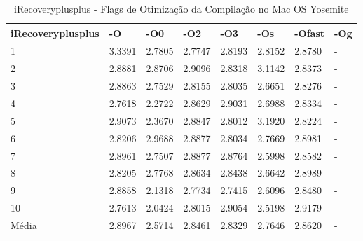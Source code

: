 \begin{table}[!ht]
\centering
\caption{iRecoveryplusplus - Flags de Otimização da Compilação no Mac OS Yosemite}
\label{tab:otimizacao_compilacao:mac:irecoveryplusplus}
\begin{tabular}{llllllll}
\textbf{iRecoveryplusplus} & \textbf{-O}  & \textbf{-O0}   & \textbf{-O2} & \textbf{-O3} & \textbf{-Os} & \textbf{-Ofast} & \textbf{-Og} \\ \toprule
1                          & 3.3391       &   2.7805       &  2.7747      &  2.8193      &  2.8152      &   2.8780        &  -           \\ 
2                          & 2.8881       &   2.8706       &  2.9096      &  2.8318      &  3.1142      &   2.8373        &  -           \\ 
3                          & 2.8863       &   2.7529       &  2.8155      &  2.8035      &  2.6651      &   2.8276        &  -           \\ 
4                          & 2.7618       &   2.2722       &  2.8629      &  2.9031      &  2.6988      &   2.8334        &  -           \\ 
5                          & 2.9073       &   2.3670      &  2.8847      &  2.8012      &  3.1920      &   2.8224        &  -           \\ 
6                          & 2.8206       &   2.9688      &  2.8877      &  2.8034      &  2.7669      &   2.8981        &  -           \\ 
7                          & 2.8961       &   2.7507      &  2.8877      &  2.8764      &  2.5998      &   2.8582        &  -           \\ 
8                          & 2.8205       &   2.7768      &  2.8634      &  2.8438      &  2.6642      &   2.8989        &  -           \\ 
9                          & 2.8858       &   2.1318      &  2.7734      &  2.7415      &  2.6096      &   2.8480        &  -           \\ 
10                         & 2.7613       &   2.0424      &  2.8015      &  2.9054      &  2.5198      &   2.9179        &  -           \\ \bottomrule
Média                      & 2.8967       &   2.5714      &  2.8461      &  2.8329      &  2.7646      &   2.8620        &  -           \\ 
\end{tabular}
\end{table}


